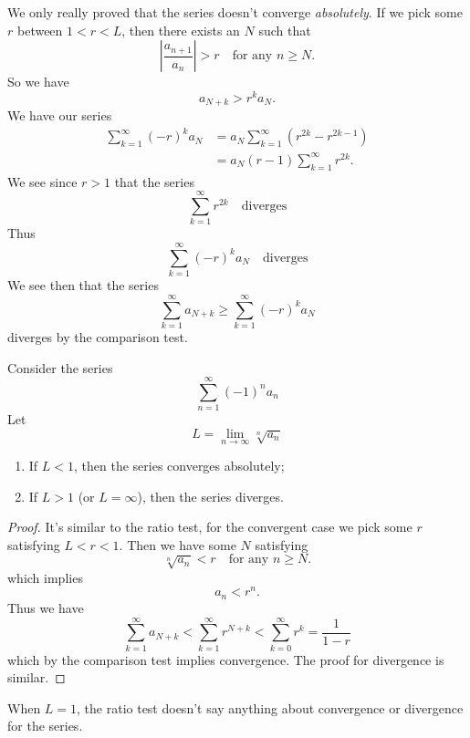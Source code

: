 \begin{remark}
We only really proved that the series doesn't converge
\emph{absolutely}. If we pick some $r$ between $1<r<L$, then
there exists an $N$ such that
\begin{equation}
\left|\frac{a_{n+1}}{a_{n}}\right|>r\quad\mbox{for any }n\geq N.
\end{equation}
So we have
\begin{equation}
a_{N+k} > r^{k}a_{N}.
\end{equation}
We have our series
\begin{equation}
\begin{aligned}
\sum^{\infty}_{k=1}(-r)^{k}a_{N}
&= a_{N} \sum^{\infty}_{k=1}(r^{2k}-r^{2k-1})\\
&= a_{N} (r-1)\sum^{\infty}_{k=1}r^{2k}.
\end{aligned}
\end{equation}
We see since $r>1$ that the series
\begin{equation}
\sum^{\infty}_{k=1}r^{2k}\quad\mbox{diverges}
\end{equation}
Thus
\begin{equation}
\sum^{\infty}_{k=1}(-r)^{k}a_{N}\quad\mbox{diverges}
\end{equation}
We see then that the series
\begin{equation}
\sum^{\infty}_{k=1}a_{N+k}\geq\sum^{\infty}_{k=1}(-r)^{k}a_{N}
\end{equation}
diverges by the comparison test.
\end{remark}


Consider the series 
\begin{equation}
\sum^{\infty}_{n=1}(-1)^{n}a_{n}
\end{equation}
Let
\begin{equation}
L = \lim_{n\to\infty}\sqrt[n]{a_{n}}
\end{equation}
\begin{enumerate}
\item If $L<1$, then the series converges absolutely;
\item If $L>1$ (or $L=\infty$), then the series diverges.
\end{enumerate}

\begin{proof}
It's similar to the ratio test, for the convergent case we pick
some $r$ satisfying $L<r<1$. Then we have some $N$ satisfying
\begin{equation}
\sqrt[n]{a_{n}}<r\quad\mbox{for any }n\geq N.
\end{equation}
which implies
\begin{equation}
a_{n}<r^{n}.
\end{equation}
Thus we have
\begin{equation}
\sum^{\infty}_{k=1}a_{N+k}<\sum^{\infty}_{k=1}r^{N+k}<\sum^{\infty}_{k=0}r^{k}=\frac{1}{1-r}
\end{equation}
which by the  comparison test implies convergence. The proof for
divergence is similar.
\end{proof}
\begin{remark}
When $L=1$, the ratio test doesn't say anything about convergence
or divergence for the series.
\end{remark}

%
